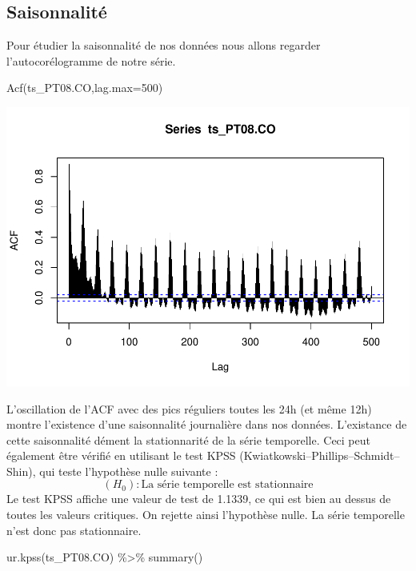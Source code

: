\documentclass[
]{article}
\newenvironment{Shaded}{\begin{snugshade}}{\end{snugshade}}
\newcommand{\AttributeTok}[1]{\textcolor[rgb]{0.77,0.63,0.00}{#1}}
\newcommand{\DecValTok}[1]{\textcolor[rgb]{0.00,0.00,0.81}{#1}}
\newcommand{\FunctionTok}[1]{\textcolor[rgb]{0.00,0.00,0.00}{#1}}
\newcommand{\NormalTok}[1]{#1}
\newcommand{\SpecialCharTok}[1]{\textcolor[rgb]{0.00,0.00,0.00}{#1}}
\begin{document}
\hypertarget{saisonnalituxe9}{%
\subsection{Saisonnalité}\label{saisonnalituxe9}}

Pour étudier la saisonnalité de nos données nous allons regarder
l'autocorélogramme de notre série.

\begin{Shaded}
\begin{Highlighting}[]
\FunctionTok{Acf}\NormalTok{(ts\_PT08.CO,}\AttributeTok{lag.max=}\DecValTok{500}\NormalTok{)}
\end{Highlighting}
\end{Shaded}

\includegraphics{STA202_report_files/figure-latex/unnamed-chunk-8-1.pdf}

L'oscillation de l'ACF avec des pics réguliers toutes les 24h (et même
12h) montre l'existence d'une saisonnalité journalière dans nos données.
L'existance de cette saisonnalité dément la stationnarité de la série
temporelle. Ceci peut également être vérifié en utilisant le test KPSS
(Kwiatkowski--Phillips--Schmidt--Shin), qui teste l'hypothèse nulle
suivante : \[(H_0): \text{La série temporelle est stationnaire}\] Le
test KPSS affiche une valeur de test de 1.1339, ce qui est bien au
dessus de toutes les valeurs critiques. On rejette ainsi l'hypothèse
nulle. La série temporelle n'est donc pas stationnaire.

\begin{Shaded}
\begin{Highlighting}[]
\FunctionTok{ur.kpss}\NormalTok{(ts\_PT08.CO) }\SpecialCharTok{\%\textgreater{}\%}
  \FunctionTok{summary}\NormalTok{()}
\end{Highlighting}
\end{Shaded}
\end{document}
